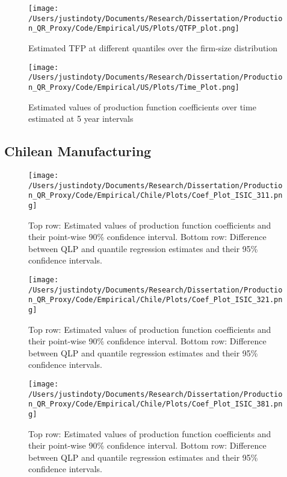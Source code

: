 \documentclass[11pt]{article}
\begin{document}
\begin{figure}[H]
\centering
\texttt{[image: /Users/justindoty/Documents/Research/Dissertation/Production\_QR\_Proxy/Code/Empirical/US/Plots/QTFP\_plot.png]}
\caption{Estimated TFP at different quantiles over the firm-size distribution}
\end{figure}

\begin{figure}[H]
\centering
\texttt{[image: /Users/justindoty/Documents/Research/Dissertation/Production\_QR\_Proxy/Code/Empirical/US/Plots/Time\_Plot.png]}
\caption{Estimated values of production function coefficients over time estimated at 5 year intervals}
\end{figure}



\subsection{Chilean Manufacturing}




\begin{figure}[H]
\centering
\texttt{[image: /Users/justindoty/Documents/Research/Dissertation/Production\_QR\_Proxy/Code/Empirical/Chile/Plots/Coef\_Plot\_ISIC\_311.png]}
\caption{Top row: Estimated values of production function coefficients and their point-wise 90\% confidence interval. Bottom row: Difference between QLP and quantile regression estimates and their 95\% confidence intervals.}
\end{figure}

\begin{figure}[H]
\centering
\texttt{[image: /Users/justindoty/Documents/Research/Dissertation/Production\_QR\_Proxy/Code/Empirical/Chile/Plots/Coef\_Plot\_ISIC\_321.png]}
\caption{Top row: Estimated values of production function coefficients and their point-wise 90\% confidence interval. Bottom row: Difference between QLP and quantile regression estimates and their 95\% confidence intervals.}
\end{figure}

\begin{figure}[H]
\centering
\texttt{[image: /Users/justindoty/Documents/Research/Dissertation/Production\_QR\_Proxy/Code/Empirical/Chile/Plots/Coef\_Plot\_ISIC\_381.png]}
\caption{Top row: Estimated values of production function coefficients and their point-wise 90\% confidence interval. Bottom row: Difference between QLP and quantile regression estimates and their 95\% confidence intervals.}
\end{figure}
\end{document}
